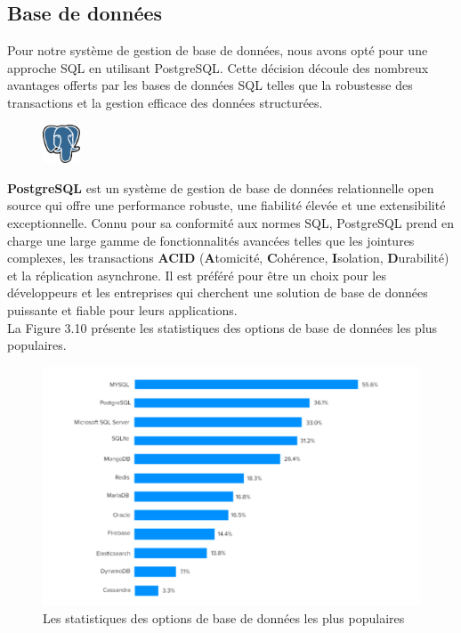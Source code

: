 \subsection{Base de données}
\noindent Pour notre système de gestion de base de données, nous avons opté pour une approche SQL en utilisant PostgreSQL. Cette décision découle des nombreux avantages offerts par les bases de données SQL telles que la robustesse des transactions et la gestion efficace des données structurées.
\vspace{0.5em}
\begin{figure}
    \vspace{-15pt}
    \includegraphics[width=0.1\textwidth]{images/chp5/postgresql.png}
\end{figure}
\textbf{PostgreSQL }est un système de gestion de base de données relationnelle open source qui offre une performance robuste, une fiabilité élevée et une extensibilité exceptionnelle. Connu pour sa conformité aux normes SQL, PostgreSQL prend en charge une large gamme de fonctionnalités avancées telles que les jointures complexes, les transactions \textbf{ACID} (\textbf{A}tomicité, \textbf{C}ohérence, \textbf{I}solation, \textbf{D}urabilité) et la réplication asynchrone. Il est préféré pour être un choix pour les développeurs et les entreprises qui cherchent une solution de base de données puissante et fiable pour leurs applications.\\
La Figure 3.10 présente les statistiques des options de base de données les plus populaires.
    \begin{figure}[H]
        \centering
        \includegraphics[width=1.2\textwidth,height=0.4\textheight]{images/chp3/fig10.png}
        \caption{Les statistiques des options de base de données les plus populaires \cite{StatsBdd}}      
        \label{fig:Les statistiques des options de base de données les plus populaires}    
    \end{figure}
    
